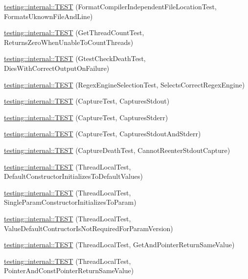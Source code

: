 \begin{DoxyCompactItemize}
\item 
\hyperlink{namespacetesting_1_1internal_a8b9aee556f3dec6e67c35830ba55e0bd}{testing\+::internal\+::\+T\+E\+ST} (Format\+Compiler\+Independent\+File\+Location\+Test, Formats\+Uknown\+File\+And\+Line)
\item 
\hyperlink{namespacetesting_1_1internal_a5ad8299ae9325382f01b945f4f81711e}{testing\+::internal\+::\+T\+E\+ST} (Get\+Thread\+Count\+Test, Returns\+Zero\+When\+Unable\+To\+Count\+Threads)
\item 
\hyperlink{namespacetesting_1_1internal_afabff70df09a0e4fcda96dd36460c2b9}{testing\+::internal\+::\+T\+E\+ST} (Gtest\+Check\+Death\+Test, Dies\+With\+Correct\+Output\+On\+Failure)
\item 
\hyperlink{namespacetesting_1_1internal_a198f7132f76dd44d48dac54dc5d38fbb}{testing\+::internal\+::\+T\+E\+ST} (Regex\+Engine\+Selection\+Test, Selects\+Correct\+Regex\+Engine)
\item 
\hyperlink{namespacetesting_1_1internal_a0b658d88cea3a2fe6775b1b269c0204b}{testing\+::internal\+::\+T\+E\+ST} (Capture\+Test, Captures\+Stdout)
\item 
\hyperlink{namespacetesting_1_1internal_abbc9510a4f690912c32835213d95198f}{testing\+::internal\+::\+T\+E\+ST} (Capture\+Test, Captures\+Stderr)
\item 
\hyperlink{namespacetesting_1_1internal_a341ff65f3ca44b27fc51f03a9a05bee8}{testing\+::internal\+::\+T\+E\+ST} (Capture\+Test, Captures\+Stdout\+And\+Stderr)
\item 
\hyperlink{namespacetesting_1_1internal_a325a786fb22b87e5aa8d8f584b42ab09}{testing\+::internal\+::\+T\+E\+ST} (Capture\+Death\+Test, Cannot\+Reenter\+Stdout\+Capture)
\item 
\hyperlink{namespacetesting_1_1internal_af366e28e373f36480decc2ea586f48f0}{testing\+::internal\+::\+T\+E\+ST} (Thread\+Local\+Test, Default\+Constructor\+Initializes\+To\+Default\+Values)
\item 
\hyperlink{namespacetesting_1_1internal_a5a52dd578217050e621ebd2aace97a70}{testing\+::internal\+::\+T\+E\+ST} (Thread\+Local\+Test, Single\+Param\+Constructor\+Initializes\+To\+Param)
\item 
\hyperlink{namespacetesting_1_1internal_a6dffc8331590224259b60e855ad07d03}{testing\+::internal\+::\+T\+E\+ST} (Thread\+Local\+Test, Value\+Default\+Contructor\+Is\+Not\+Required\+For\+Param\+Version)
\item 
\hyperlink{namespacetesting_1_1internal_a0e7c2d58a313bec0821df19f44351d84}{testing\+::internal\+::\+T\+E\+ST} (Thread\+Local\+Test, Get\+And\+Pointer\+Return\+Same\+Value)
\item 
\hyperlink{namespacetesting_1_1internal_aaed45d6ba960f02e8d3d042c606bc98e}{testing\+::internal\+::\+T\+E\+ST} (Thread\+Local\+Test, Pointer\+And\+Const\+Pointer\+Return\+Same\+Value)
\end{DoxyCompactItemize}


